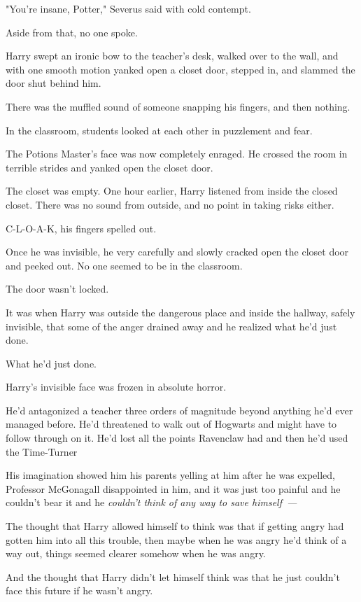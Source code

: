 "You're insane, Potter," Severus said with cold contempt.

Aside from that, no one spoke.

Harry swept an ironic bow to the teacher's desk, walked over to the wall, and
with one smooth motion yanked open a closet door, stepped in, and slammed the
door shut behind him.

There was the muffled sound of someone snapping his fingers, and then nothing.

In the classroom, students looked at each other in puzzlement and fear.

The Potions Master's face was now completely enraged. He crossed the room in
terrible strides and yanked open the closet door.

The closet was empty.
\sbreak
One hour earlier, Harry listened from inside the closed closet. There was no
sound from outside, and no point in taking risks either.

C-L-O-A-K, his fingers spelled out.

Once he was invisible, he very carefully and slowly cracked open the closet
door and peeked out. No one seemed to be in the classroom.

The door wasn't locked.

It was when Harry was outside the dangerous place and inside the hallway,
safely invisible, that some of the anger drained away and he realized what he'd
just done.

What he'd just done.

Harry's invisible face was frozen in absolute horror.

He'd antagonized a teacher three orders of magnitude beyond anything he'd ever
managed before. He'd threatened to walk out of Hogwarts and might have to
follow through on it. He'd lost all the points Ravenclaw had and then he'd used
the Time-Turner{\el}

His imagination showed him his parents yelling at him after he was expelled,
Professor McGonagall disappointed in him, and it was just too painful and he
couldn't bear it and he \emph{couldn't think of any way to save himself~--- }

The thought that Harry allowed himself to think was that if getting angry had
gotten him into all this trouble, then maybe when he was angry he'd think of a
way out, things seemed clearer somehow when he was angry.

And the thought that Harry didn't let himself think was that he just couldn't
face this future if he wasn't angry.

